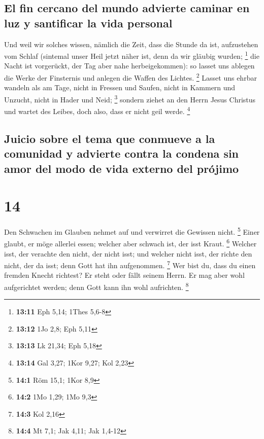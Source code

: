 \hypertarget{el-fin-cercano-del-mundo-advierte-caminar-en-luz-y-santificar-la-vida-personal}{%
\subsection{El fin cercano del mundo advierte caminar en luz y
santificar la vida
personal}\label{el-fin-cercano-del-mundo-advierte-caminar-en-luz-y-santificar-la-vida-personal}}

 Und weil wir solches wissen, nämlich die Zeit, dass die
Stunde da ist, aufzustehen vom Schlaf (sintemal unser Heil jetzt näher
ist, denn da wir gläubig wurden; \footnote{\textbf{13:11} Eph 5,14;
  1Thes 5,6-8}  die Nacht ist vorgerückt, der Tag aber
nahe herbeigekommen): so lasset uns ablegen die Werke der Finsternis und
anlegen die Waffen des Lichtes. \footnote{\textbf{13:12} 1Jo 2,8; Eph
  5,11}  Lasset uns ehrbar wandeln als am Tage, nicht in
Fressen und Saufen, nicht in Kammern und Unzucht, nicht in Hader und
Neid; \footnote{\textbf{13:13} Lk 21,34; Eph 5,18} 
sondern ziehet an den Herrn Jesus Christus und wartet des Leibes, doch
also, dass er nicht geil werde. \footnote{\textbf{13:14} Gal 3,27; 1Kor
  9,27; Kol 2,23}

\hypertarget{juicio-sobre-el-tema-que-conmueve-a-la-comunidad-y-advierte-contra-la-condena-sin-amor-del-modo-de-vida-externo-del-pruxf3jimo}{%
\subsection{Juicio sobre el tema que conmueve a la comunidad y advierte
contra la condena sin amor del modo de vida externo del
prójimo}\label{juicio-sobre-el-tema-que-conmueve-a-la-comunidad-y-advierte-contra-la-condena-sin-amor-del-modo-de-vida-externo-del-pruxf3jimo}}

\hypertarget{section-13}{%
\section{14}\label{section-13}}

 Den Schwachen im Glauben nehmet auf und verwirret die
Gewissen nicht. \footnote{\textbf{14:1} Röm 15,1; 1Kor 8,9}
 Einer glaubt, er möge allerlei essen; welcher aber
schwach ist, der isst Kraut. \footnote{\textbf{14:2} 1Mo 1,29; 1Mo 9,3}
 Welcher isst, der verachte den nicht, der nicht isst; und
welcher nicht isst, der richte den nicht, der da isst; denn Gott hat ihn
aufgenommen. \footnote{\textbf{14:3} Kol 2,16}  Wer bist
du, dass du einen fremden Knecht richtest? Er steht oder fällt seinem
Herrn. Er mag aber wohl aufgerichtet werden; denn Gott kann ihn wohl
aufrichten. \footnote{\textbf{14:4} Mt 7,1; Jak 4,11; Jak 1,4-12}

